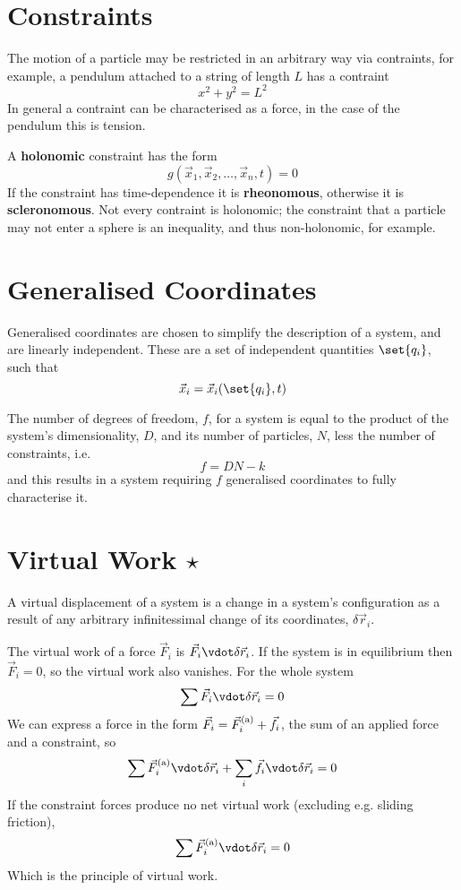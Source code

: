 
\section{Constraints}
\label{sec:constraints}

The motion of a particle may be restricted in an arbitrary way via
contraints, for example, a pendulum attached to a string of length $L$
has a contraint 
\[ x^2 + y^2 = L^2 \] In general a contraint can be characterised as a
force, in the case of the pendulum this is tension.

A \textbf{holonomic} constraint has the form
\[ g(\vec{x}_1, \vec{x}_2, \dots, \vec{x}_n, t) = 0 \] If the
constraint has time-dependence it is \textbf{rheonomous}, otherwise it
is \textbf{scleronomous}. Not every contraint is holonomic; the
constraint that a particle may not enter a sphere is an inequality,
and thus non-holonomic, for example.

\section{Generalised Coordinates}
\label{sec:gener-coord}

Generalised coordinates are chosen to simplify the description of a
system, and are linearly independent. These are a set of independent
quantities $\set{q_i}$, such that
\begin{equation}
  \label{eq:11}
  \vec{x}_i = \vec{x}_i(\set{q_i}, t) 
\end{equation}

The number of degrees of freedom, $f$, for a system is equal to the product
of the system's dimensionality, $D$, and its number of particles, $N$,
less the number of constraints, i.e.
\[ f = DN - k \] and this results in a system requiring $f$
generalised coordinates to fully characterise it.

\section{Virtual Work $\star$}
\label{sec:virtual-work}

A virtual displacement of a system is a change in a system's
configuration as a result of any arbitrary infinitessimal change of
its coordinates, $\delta \vec{r}_i$.

The virtual work of a force $\vec{F}_i$ is $\vec{F}_i \vdot \delta
\vec{r}_i$. If the system is in equilibrium then $\vec{F}_i = 0$, so
the virtual work also vanishes. For the whole system
\[ \sum \vec{F}_i \vdot \delta \vec{r}_i = 0 \] We can express a force
in the form $\vec{F}_i = \vec{F}_i^{\rm (a)} +\vec{f}_i$, the sum of
an applied force and a constraint, so
\begin{equation}
  \label{eq:12}
  \sum \vec{F}_i^{\rm (a)} \vdot \delta \vec{r}_i + \sum_i \vec{f}_i \vdot \delta \vec{r}_i =0
\end{equation}
If the constraint forces produce no net virtual work (excluding e.g. sliding friction),
\begin{equation}
  \label{eq:13}
  \sum \vec{F}_i^{\rm (a)} \vdot \delta \vec{r}_i = 0
\end{equation}
Which is the principle of virtual work.

